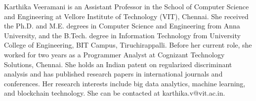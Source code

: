 \documentclass{ieeeaccess}
\theoremstyle{remark}
\begin{document}
\begin{IEEEbiography}{Karthika Veeramani}
is an Assistant Professor in the School of Computer Science and Engineering at Vellore Institute of Technology (VIT), Chennai. She received the Ph.D. and M.E. degrees in Computer Science and Engineering from Anna University, and the B.Tech. degree in Information Technology from University College of Engineering, BIT Campus, Tiruchirappalli. Before her current role, she worked for two years as a Programmer Analyst at Cognizant Technology Solutions, Chennai. She holds an Indian patent on regularized discriminant analysis and has published research papers in international journals and conferences. Her research interests include big data analytics, machine learning, and blockchain technology. She can be contacted at karthika.v@vit.ac.in.
\end{IEEEbiography}

\EOD
\end{document}
